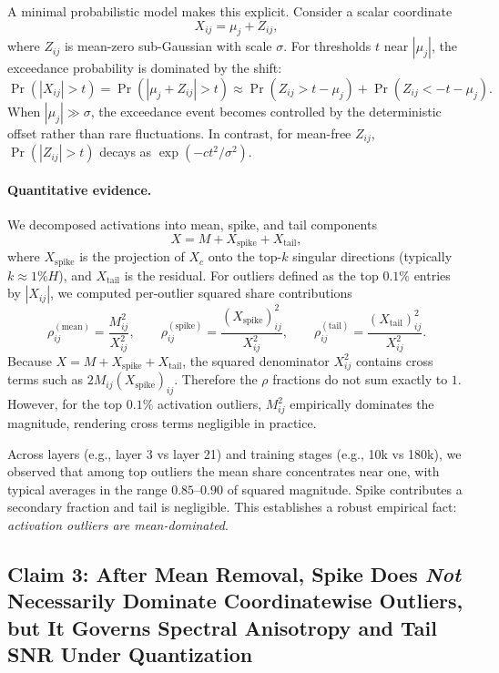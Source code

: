 A minimal probabilistic model makes this explicit. Consider a scalar coordinate
\[
X_{ij} = \mu_j + Z_{ij},
\]
where $Z_{ij}$ is mean-zero sub-Gaussian with scale $\sigma$. For thresholds $t$ near $|\mu_j|$, the exceedance probability is dominated by the shift:
\[
\Pr(|X_{ij}|>t) = \Pr(|\mu_j + Z_{ij}|>t) \approx \Pr(Z_{ij}>t-\mu_j) + \Pr(Z_{ij}< -t-\mu_j).
\]
When $|\mu_j|\gg \sigma$, the exceedance event becomes controlled by the deterministic offset rather than rare fluctuations. In contrast, for mean-free $Z_{ij}$, $\Pr(|Z_{ij}|>t)$ decays as $\exp(-ct^2/\sigma^2)$.

\paragraph{Quantitative evidence.}
We decomposed activations into mean, spike, and tail components
\[
X = M + X_{\mathrm{spike}} + X_{\mathrm{tail}},
\]
where $X_{\mathrm{spike}}$ is the projection of $X_c$ onto the top-$k$ singular directions (typically $k\approx 1\%H$), and $X_{\mathrm{tail}}$ is the residual. For outliers defined as the top $0.1\%$ entries by $|X_{ij}|$, we computed per-outlier squared share contributions
\[
\rho^{(\mathrm{mean})}_{ij} = \frac{M_{ij}^2}{X_{ij}^2},\qquad
\rho^{(\mathrm{spike})}_{ij} = \frac{(X_{\mathrm{spike}})_{ij}^2}{X_{ij}^2},\qquad
\rho^{(\mathrm{tail})}_{ij} = \frac{(X_{\mathrm{tail}})_{ij}^2}{X_{ij}^2}.
\]
Because $X = M + X_{\mathrm{spike}} + X_{\mathrm{tail}}$,
the squared denominator $X_{ij}^2$ contains cross terms such as
$2 M_{ij}(X_{\mathrm{spike}})_{ij}$.
Therefore the $\rho$ fractions do not sum exactly to $1$.
However, for the top $0.1\%$ activation outliers,
$M_{ij}^2$ empirically dominates the magnitude,
rendering cross terms negligible in practice.

Across layers (e.g., layer 3 vs layer 21) and training stages (e.g., 10k vs 180k), we observed that among top outliers the mean share concentrates near one, with typical averages in the range $0.85$--$0.90$ of squared magnitude. Spike contributes a secondary fraction and tail is negligible. This establishes a robust empirical fact: \emph{activation outliers are mean-dominated}.

\subsection{Claim 3: After Mean Removal, Spike Does \emph{Not} Necessarily Dominate Coordinatewise Outliers, but It Governs Spectral Anisotropy and Tail SNR Under Quantization}

